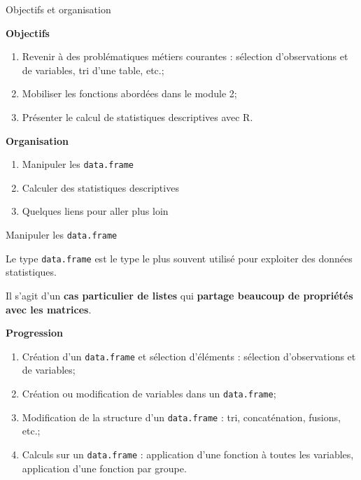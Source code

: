 \documentclass[12pt,ignorenonframetext,]{beamer}
\providecommand{\tightlist}{%
  \setlength{\itemsep}{0pt}\setlength{\parskip}{0pt}}
\newcommand{\strong}[1]{\textbf{\textcolor{redInsee}{#1}}}
\begin{document}
\begin{frame}[fragile]{Objectifs et organisation}
\protect\hypertarget{objectifs-et-organisation-2}{}

\strong{Objectifs}

\begin{enumerate}
[1.]
\tightlist
\item
  Revenir à des problématiques métiers courantes : sélection
  d’observations et de variables, tri d’une table, etc.;
\item
  Mobiliser les fonctions abordées dans le module 2;
\item
  Présenter le calcul de statistiques descriptives avec R.
\end{enumerate}

\bigskip \pause \strong{Organisation}

\begin{enumerate}
[1.]
\item
  Manipuler les \texttt{data.frame}
\item
  Calculer des statistiques descriptives
\item
  Quelques liens pour aller plus loin
\end{enumerate}

\end{frame}

\begin{frame}[fragile]{Manipuler les \texttt{data.frame}}
\protect\hypertarget{manipuler-les-data.frame}{}

Le type \texttt{data.frame} est le type le plus souvent utilisé pour
exploiter des données statistiques.

\pause Il s’agit d’un \textbf{cas particulier de listes} qui
\textbf{partage beaucoup de propriétés avec les matrices}.

\bigskip \pause \strong{Progression}

\begin{enumerate}
[1.]
\item
  Création d’un \texttt{data.frame} et sélection d’éléments : sélection
  d’observations et de variables;
\item
  \pause Création ou modification de variables dans un
  \texttt{data.frame};
\item
  \pause Modification de la structure d’un \texttt{data.frame} : tri,
  concaténation, fusions, etc.;
\item
  \pause Calculs sur un \texttt{data.frame} : application d’une fonction
  à toutes les variables, application d’une fonction par groupe.
\end{enumerate}

\end{frame}
\end{document}
